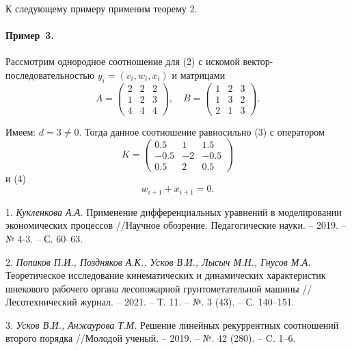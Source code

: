 К следующему примеру применим теорему 2.

\paragraph{Пример~3.}
Рассмотрим однородное соотношение для (2) с искомой вектор-последовательностью $y_i=(v_i, w_i, x_i)$ и матрицами
\[A=\begin{pmatrix}
2&2&2\\
1&2&3\\
4&4&4
\end{pmatrix}, \quad B= \begin{pmatrix}
1&2&3\\
1&3&2\\
2&1&3
\end{pmatrix}.\]

Имеем: $d=3\ne0$. Тогда данное соотношение равносильно (3) с оператором
\[K=\begin{pmatrix}
 0.5 &  1 &  1.5\\
-0.5 & -2 & -0.5\\
 0.5 &  2 &  0.5
\end{pmatrix}\]
и (4)
\[w_{i+1}+x_{i+1}=0.\]

\litlist

1. {\it Кукленкова А.А.} Применение дифференциальных уравнений в моделировании экономических процессов //Научное обозрение. Педагогические науки. – 2019. – № 4-3. – С. 60–63.

2. {\it Попиков П.И., Поздняков А.К., Усков В.И., Лысыч М.Н., Гнусов М.А.} Теоретическое исследование кинематических и динамических характеристик шнекового рабочего органа лесопожарной грунтометательной машины //Лесотехнический журнал. – 2021. – Т. 11. – №. 3 (43). – С. 140–151.

3. {\it Усков В.И., Анжаурова Т.М.} Решение линейных рекуррентных соотношений второго порядка //Молодой ученый. – 2019. – №. 42 (280). – C. 1–6.

